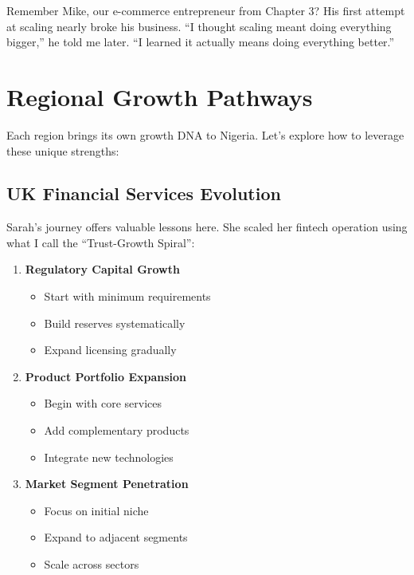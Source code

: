 Remember Mike, our e-commerce entrepreneur from Chapter 3? His first attempt at scaling nearly broke his business. ``I thought scaling meant doing everything bigger,'' he told me later. ``I learned it actually means doing everything better.''

\section{Regional Growth Pathways}\label{sec:regional-growth-pathways}

Each region brings its own growth DNA to Nigeria. Let's explore how to leverage these unique strengths:

\subsection{UK Financial Services Evolution}\label{subsec:uk-financial-evolution}

Sarah's journey offers valuable lessons here. She scaled her fintech operation using what I call the ``Trust-Growth Spiral'':

\begin{tcolorbox}[colback=white,colframe=primary,title=\textbf{Financial Services Growth Model}]
\begin{enumerate}
    \item \textbf{Regulatory Capital Growth}
    \begin{itemize}
        \item Start with minimum requirements
        \item Build reserves systematically
        \item Expand licensing gradually
    \end{itemize}

    \item \textbf{Product Portfolio Expansion}
    \begin{itemize}
        \item Begin with core services
        \item Add complementary products
        \item Integrate new technologies
    \end{itemize}

    \item \textbf{Market Segment Penetration}
    \begin{itemize}
        \item Focus on initial niche
        \item Expand to adjacent segments
        \item Scale across sectors
    \end{itemize}
\end{enumerate}
\end{tcolorbox}

